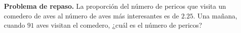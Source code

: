 \item \textbf{Problema de repaso.} La proporción del número de pericos que visita un comedero de aves al número de aves más interesantes es de $2.25$. Una mañana, cuando $91$ aves visitan el comedero, ¿cuál es el número de pericos?
